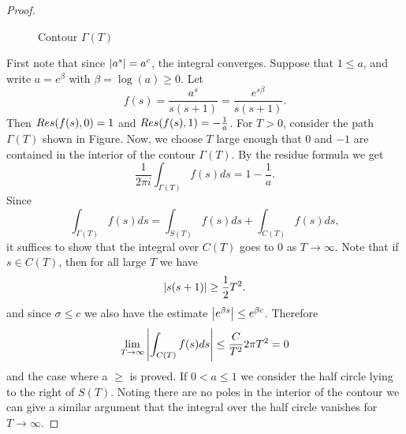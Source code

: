 \begin{proof}
\begin{figure}[!htb]
\begin{minipage}[c]{0.5\textwidth}
\end{minipage}
\caption{Contour $\Gamma(T)$}
\label{fig:ContourGamma}
\end{figure}
	First note that since $\left|a^s\right| = a^c$, the integral converges. Suppose that $1 \leq a$, and write $a = e^\beta$ with $\beta = \log(a) \geq 0$. Let
\begin{equation*}
	f(s) = \frac{a^s}{s(s + 1)} = \frac{e^{s \beta}}{s(s + 1)}.
\end{equation*}
	Then $\mathop{Res}(f(s), 0) = 1$ and $\mathop{Res}(f(s), 1) = -\frac{1}{a}$. For $T > 0$, consider the path $\Gamma(T)$ shown in Figure. Now, we choose $T$ large enough that $0$ and $-1$ are contained in the interior of the contour $\Gamma(T)$. By the residue formula we get
\begin{equation*}
	\frac{1}{2 \pi i} \int _{\Gamma(T)} f(s) ds = 1 - \frac{1}{a}.
\end{equation*}
	Since
\begin{equation*}
	\int _{\Gamma(T)} f(s) ds = \int _{S(T)} f(s) ds + \int _{C(T)} f(s) ds,
\end{equation*}
	it suffices to show that the integral over $C(T)$ goes to $0$ as $T \to \infty$. Note that if $s \in C(T)$, then for all large $T$ we have
\begin{equation*}
	\left|s(s + 1)\right| \geq \frac{1}{2} T^2.
\end{equation*}
	and since $\sigma \leq c$ we also have the estimate $\left|e^{\beta s}\right| \leq e^{\beta c}$. Therefore
\begin{equation*}
	\lim _{T \to \infty} \left|\int _{C(T)} f(s) ds\right| \leq \frac{C}{T^2} 2 \pi T^2 = 0
\end{equation*}
	and the case where a $\geq$ is proved. If $0 < a \leq 1$ we consider the half circle lying to the right of $S(T)$. Noting there are no poles in the interior of the contour we can give a similar argument that the integral over the half circle vanishes for $T \to \infty$.
\end{proof}


